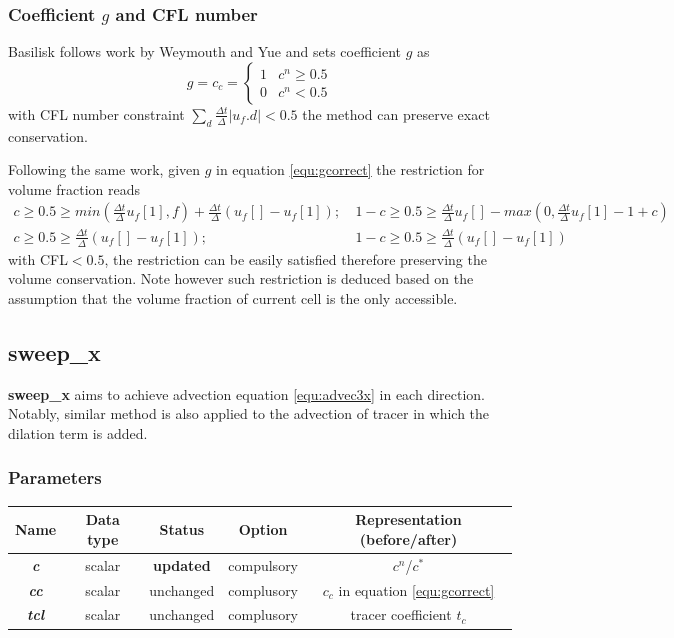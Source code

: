 \documentclass[a4paper]{article}
\newcommand{\func}[1]{\textbf{\textcolor{function}{#1}}}
\newcommand{\para}[1]{\textbf{\emph{\textcolor{para}{#1}}}}
\begin{document}
\subsubsection{Coefficient $g$ and CFL number}\label{sec:glimit}
Basilisk follows work by Weymouth and Yue\cite{2010_Weymouth} and sets coefficient $g$ as 
\begin{equation}\label{equ:gcorrect}
    g=c_c=\left\{
    \begin{array}{cc}
    1     &  c^n \geq 0.5\\
    0     &  c^n <0.5
    \end{array}
    \right.
\end{equation}
with CFL number constraint $\sum_d \frac{\Delta t}{\Delta}|u_f.d|<0.5$ the method can preserve exact conservation.\par
Following the same work, given $g$ in equation \ref{equ:gcorrect} the restriction for volume fraction reads
\begin{align}
    c\geq0.5\geq min(\frac{\Delta t}{\Delta} u_f[1],f)+\frac{\Delta t}{\Delta}(u_f[]-u_f[1]);&\  1-c\geq0.5\geq \frac{\Delta t}{\Delta}u_f[]-max(0,\frac{\Delta t}{\Delta}u_f[1]-1+c)\\
    c\geq0.5\geq \frac{\Delta t}{\Delta}(u_f[]-u_f[1]);&\  1-c\geq0.5\geq \frac{\Delta t}{\Delta}(u_f[]-u_f[1])\label{equ:restriction}
\end{align}
with CFL$<0.5$, the restriction can be easily satisfied therefore preserving the volume conservation. Note however such restriction is deduced based on the assumption that the volume fraction of current cell is the only accessible.

\subsection{\func{sweep\_x}}
\func{sweep\_x} aims to achieve advection equation \ref{equ:advec3x} in each direction. Notably, similar method is also applied to the advection of tracer in which the dilation term is added.
\subsubsection{Parameters}
\begin{table}[h]
  \centering
  \begin{tabular}{|c|c|c|c|c|}
    \hline
    Name & Data type & Status & Option & Representation (before/after)\\[0.5ex]
    \hline\hline
    \rowcolor{output} \para{c} & scalar & \textbf{updated} & compulsory & $c^n$/$c^\ast$\\
    \hline
    \para{cc} & scalar & unchanged & complusory & $c_c$ in equation \ref{equ:gcorrect}\\
    \hline
    \para{tcl} & scalar & unchanged & complusory & tracer coefficient $t_c$\\
    \hline
  \end{tabular}
\end{table}
\end{document}

